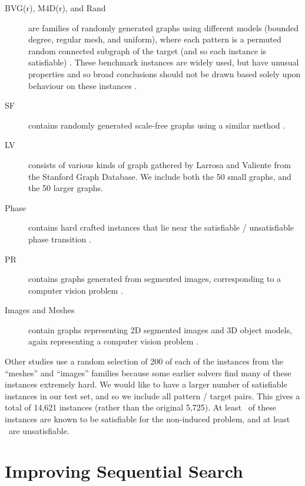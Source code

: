 \documentclass[runningheads]{llncs}
\begin{document}
\begin{description}
    \item[BVG(r), M4D(r), and Rand] are families of randomly generated graphs using different models (bounded
        degree, regular mesh, and uniform), where each pattern is a permuted random connected subgraph
        of the target (and so each instance is satisfiable) \cite{DBLP:journals/pami/CordellaFSV04}.
        These benchmark instances are widely used, but have unusual properties and so broad
        conclusions should not be drawn based solely upon behaviour on these instances
        \cite{DBLP:journals/jair/McCreeshPST18}.
    \item[SF] contains randomly generated scale-free graphs using a similar method
        \cite{DBLP:journals/constraints/ZampelliDS10}.
   \item[LV] consists of various kinds of graph gathered by Larrosa and Valiente
       \cite{DBLP:journals/mscs/LarrosaV02} from the Stanford Graph Database. We include both the
        50 small graphs, and the 50 larger graphs.
    \item[Phase] contains hard crafted instances that lie near the satisfiable / unsatisfiable phase
        transition \cite{DBLP:journals/jair/McCreeshPST18}.
    \item[PR] contains graphs generated from segmented images, corresponding to a computer vision
        problem \cite{DBLP:journals/pr/SolnonDHJ15}.
    \item[Images and Meshes] contain graphs representing 2D segmented images and 3D object models,
        again representing a computer vision problem \cite{DBLP:journals/cviu/DamiandSHJS11}.
\end{description}

\noindent
Other studies use a random selection of 200 of each of the instances from the ``meshes'' and
``images'' families because some earlier solvers find many of these instances extremely hard. We
would like to have a larger number of satisfiable instances in our test set, and so we include all
pattern / target pairs. This gives a total of 14,621 instances (rather than the original 5,725). At
least \unskip\ of these instances are known to be satisfiable for the
non-induced problem, and at least \unskip\ are unsatisfiable.

\section{Improving Sequential Search}
\end{document}
